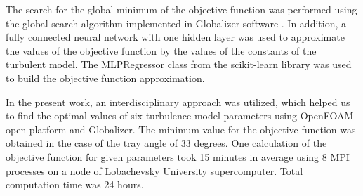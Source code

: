 \documentclass[applsci,article,submit,moreauthors,pdftex]{Definitions/mdpi}
\begin{document}
\begin{paracol}{2}
The search for the global minimum of the objective function was performed using the global search algorithm implemented in Globalizer software \cite{globalizerSystem}. In addition, a fully connected neural network with one hidden layer was used to approximate the values of the objective function by the values of the constants of the turbulent model. The MLPRegressor class from the scikit-learn library was used to build the objective function approximation. 

In the present work, an interdisciplinary approach was utilized, which helped us to find the optimal values of six turbulence model parameters using OpenFOAM open platform and Globalizer. The minimum value for the objective function was obtained in the case of the tray angle of 33 degrees. One calculation of the objective function for given parameters took 15 minutes in average using 8 MPI processes on a node of Lobachevsky University supercomputer. Total computation time was 24 hours.  




%

\vspace{6pt} 





\end{paracol}
\end{document}
